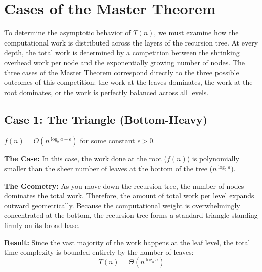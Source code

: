 \documentclass[11pt, a4paper]{article}
\begin{document}
\section*{Cases of the Master Theorem}
To determine the asymptotic behavior of $T(n)$, we must examine how the computational work is distributed across the layers of the recursion tree. At every depth, the total work is determined by a competition between the shrinking overhead work per node and the exponentially growing number of nodes. The three cases of the Master Theorem correspond directly to the three possible outcomes of this competition: the work at the leaves dominates, the work at the root dominates, or the work is perfectly balanced across all levels.
\vspace{0.5cm}
\subsection*{Case 1: The Triangle (Bottom-Heavy)}

\begin{tcolorbox}[colback=accent1!10, colframe=accent1, title=\textbf{Condition}]
$f(n) = O(n^{\log_b a - \epsilon})$ for some constant $\epsilon > 0$.
\end{tcolorbox}
\textbf{The Case:} In this case, the work done at the root ($f(n)$) is polynomially smaller than the sheer number of leaves at the bottom of the tree ($n^{\log_b a}$).

\textbf{The Geometry:} As you move down the recursion tree, the number of nodes dominates the total work. Therefore, the amount of total work per level expands outward geometrically. Because the computational weight is overwhelmingly concentrated at the bottom, the recursion tree forms a standard triangle standing firmly on its broad base. 

\textbf{Result:} Since the vast majority of the work happens at the leaf level, the total time complexity is bounded entirely by the number of leaves: 
\begin{equation*}
    T(n) = \Theta(n^{\log_b a})
\end{equation*}

\vspace{0.5cm}
\begin{center}
\end{center}
\vspace{1cm}
\end{document}
